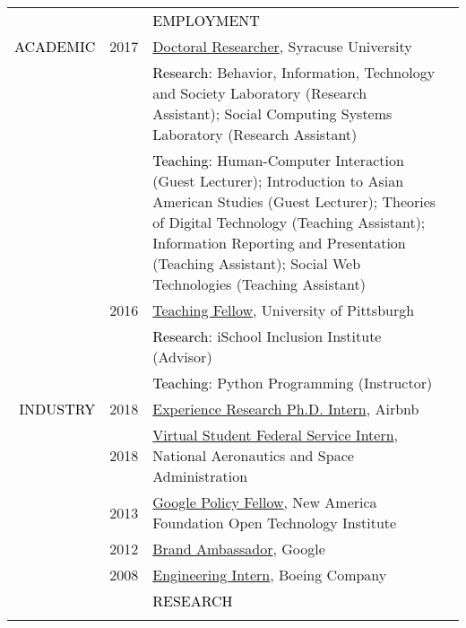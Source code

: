 \documentclass[12pt]{article}
\begin{document}
{{\begin{longtable}{Rp{1.0in}p{0.25in}p{4.75in}}
&&\par \Large \textcolor{black}{\uppercase{Employment}}\\ \hhline{~~-} 

\textcolor{black}{\footnotesize{\uppercase{Academic}}} & \footnotesize{2017} & \href{http://bits.ischool.syr.edu/}{{Doctoral Researcher}}, Syracuse University \\ && \textcolor{black}{Research}: Behavior, Information, Technology and Society Laboratory (Research Assistant); Social Computing Systems Laboratory (Research Assistant) \\ && \textcolor{black}{Teaching}: Human-Computer Interaction (Guest Lecturer); Introduction to Asian American Studies (Guest Lecturer); Theories of Digital Technology (Teaching Assistant); Information Reporting and Presentation (Teaching Assistant); Social Web Technologies (Teaching Assistant) \\

& \footnotesize{2016} & \href{http://www.sis.pitt.edu/i3/phd-fellows/fellow-profiles.html}{{Teaching Fellow}}, University of Pittsburgh \\ &&\textcolor{black}{Research}: iSchool Inclusion Institute (Advisor) \\ &&\textcolor{black}{Teaching}: Python Programming (Instructor) \\

\textcolor{black}{\footnotesize{\uppercase{Industry}}} & \footnotesize{2018} & \href{https://www.airbnb.com/}{{Experience Research Ph.D. Intern}}, Airbnb \\

& \footnotesize{2018} & \href{https://vsfs.state.gov/about}{{Virtual Student Federal Service Intern}}, National Aeronautics and Space Administration \\

& \footnotesize{2013} & \href{https://www.google.com/policyfellowship/2013fellows.html}{{Google Policy Fellow}}, New America Foundation Open Technology Institute \\

& \footnotesize{2012} & \href{https://students.googleblog.com/2012/09/a-new-class-of-google-student.html}{{Brand Ambassador}}, Google \\

& \footnotesize{2008} & \href{http://www.engr.washington.edu/curr\_students/studentprogs/alva.html}{{Engineering Intern}}, Boeing Company \bigskip \\

&&\par \Large \textcolor{black}{\uppercase{Research}} \\ \hhline{~~-}


\end{longtable}}}
\end{document}
